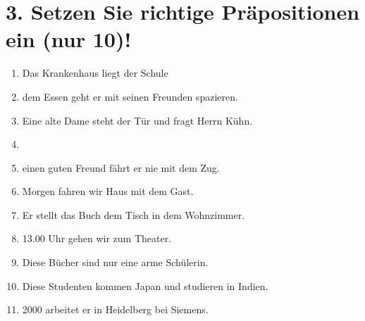 \documentclass[12pt]{article}
\begin{document}
\section*{3. Setzen Sie richtige Präpositionen ein (nur 10)!}

\begin{enumerate}
\item Das Krankenhaus liegt der Schule \underline{\hspace{2cm}}
\item \underline{\hspace{2cm}} dem Essen geht er mit seinen Freunden spazieren.
\item Eine alte Dame steht \underline{\hspace{2cm}} der Tür und fragt Herrn Kühn.
\item 
\item \underline{\hspace{2cm}} einen guten Freund fährt er nie mit dem Zug.
\item Morgen fahren wir \underline{\hspace{2cm}} Haus mit dem Gast.
\item Er stellt das Buch \underline{\hspace{2cm}} dem Tisch in dem Wohnzimmer.
\item \underline{\hspace{2cm}} 13.00 Uhr gehen wir zum Theater.
\item Diese Bücher sind nur \underline{\hspace{2cm}} eine arme Schülerin.
\item Diese Studenten kommen \underline{\hspace{2cm}} Japan und studieren in Indien.
\item \underline{\hspace{2cm}} 2000 arbeitet er in Heidelberg bei Siemens.
\end{enumerate}
\end{document}
